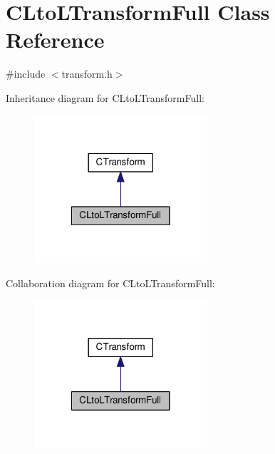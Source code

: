 \hypertarget{classCLtoLTransformFull}{\section{C\-Lto\-L\-Transform\-Full Class Reference}
\label{classCLtoLTransformFull}
}


{\ttfamily \#include $<$transform.\-h$>$}



Inheritance diagram for C\-Lto\-L\-Transform\-Full\-:\nopagebreak
\begin{figure}[H]
\begin{center}
\leavevmode
\includegraphics[width=182pt]{classCLtoLTransformFull__inherit__graph}
\end{center}
\end{figure}


Collaboration diagram for C\-Lto\-L\-Transform\-Full\-:\nopagebreak
\begin{figure}[H]
\begin{center}
\leavevmode
\includegraphics[width=182pt]{classCLtoLTransformFull__coll__graph}
\end{center}
\end{figure}
